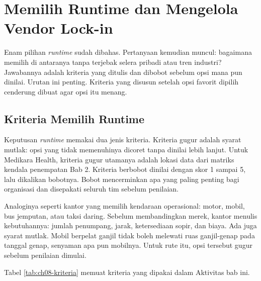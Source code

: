 \section{Memilih Runtime dan Mengelola Vendor Lock-in}
\label{sec:ch08-memilih}

Enam pilihan \textit{runtime} sudah dibahas. Pertanyaan kemudian muncul: bagaimana memilih di
antaranya tanpa terjebak selera pribadi atau tren industri? Jawabannya adalah kriteria yang ditulis
dan dibobot sebelum opsi mana pun dinilai. Urutan ini penting. Kriteria yang disusun setelah opsi
favorit dipilih cenderung dibuat agar opsi itu menang.

\subsection{Kriteria Memilih Runtime}

Keputusan \textit{runtime} memakai dua jenis kriteria. Kriteria gugur adalah syarat mutlak: opsi
yang tidak memenuhinya dicoret tanpa dinilai lebih lanjut. Untuk Medikara Health, kriteria gugur
utamanya adalah lokasi data dari matriks kendala penempatan Bab 2. Kriteria berbobot dinilai
dengan skor 1 sampai 5, lalu dikalikan bobotnya. Bobot mencerminkan apa yang paling penting bagi
organisasi dan disepakati seluruh tim sebelum penilaian.

Analoginya seperti kantor yang memilih kendaraan operasional: motor, mobil, bus jemputan, atau
taksi daring. Sebelum membandingkan merek, kantor menulis kebutuhannya: jumlah penumpang, jarak,
ketersediaan sopir, dan biaya. Ada juga syarat mutlak. Mobil berpelat ganjil tidak boleh melewati
ruas ganjil-genap pada tanggal genap, senyaman apa pun mobilnya. Untuk rute itu, opsi tersebut
gugur sebelum penilaian dimulai.

Tabel \ref{tab:ch08-kriteria} memuat kriteria yang dipakai dalam Aktivitas bab ini.

